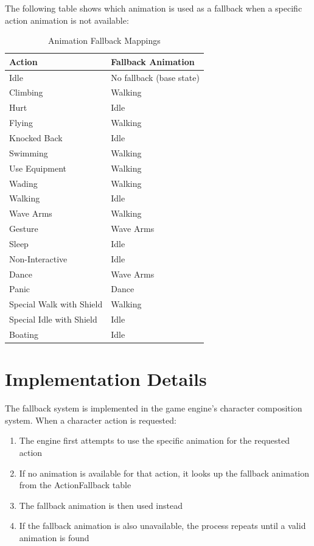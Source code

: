 \documentclass[11pt,letterpaper,oldstylefigures]{memoir}
\begin{document}
The following table shows which animation is used as a fallback when a specific action animation is not available:

\begin{table}[h]
\centering
\begin{tabular}{|l|l|}
\hline
\textbf{Action} & \textbf{Fallback Animation} \\
\hline
Idle & No fallback (base state) \\
Climbing & Walking \\
Hurt & Idle \\
Flying & Walking \\
Knocked Back & Idle \\
Swimming & Walking \\
Use Equipment & Walking \\
Wading & Walking \\
Walking & Idle \\
Wave Arms & Walking \\
Gesture & Wave Arms \\
Sleep & Idle \\
Non-Interactive & Idle \\
Dance & Wave Arms \\
Panic & Dance \\
Special Walk with Shield & Walking \\
Special Idle with Shield & Idle \\
Boating & Idle \\
\hline
\end{tabular}
\caption{Animation Fallback Mappings}
\label{tab:animation-fallbacks}
\end{table}

\section{Implementation Details}

The fallback system is implemented in the game engine's character composition system. When a character action is requested:

\begin{enumerate}
\item The engine first attempts to use the specific animation for the requested action
\item If no animation is available for that action, it looks up the fallback animation from the ActionFallback table
\item The fallback animation is then used instead
\item If the fallback animation is also unavailable, the process repeats until a valid animation is found
\end{enumerate}
\end{document}
